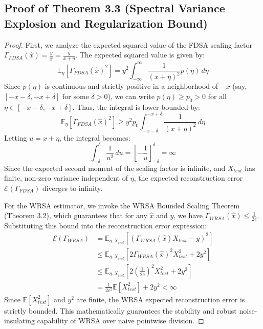 \documentclass{article}
\theoremstyle{plain}
\theoremstyle{definition}
\theoremstyle{remark}
\begin{document}
\subsection{Proof of Theorem 3.3 (Spectral Variance Explosion and Regularization Bound)}
\label{app:proof_variance_explosion}
\begin{proof}
  First, we analyze the expected squared value of the FDSA scaling factor $\Gamma_{FDSA}(\hat{x}) = \frac{y}{\hat{x}} = \frac{y}{x + \eta}$. The expected squared value is given by:
  \begin{equation}
    \mathbb{E}_{\eta} \left[ \Gamma_{FDSA}(\hat{x})^2 \right] = y^2 \int_{-\infty}^{\infty} \frac{1}{(x + \eta)^2} p(\eta) \, d\eta
  \end{equation}
  Since $p(\eta)$ is continuous and strictly positive in a neighborhood of $-x$ (say, $[ -x - \delta, -x + \delta ]$ for some $\delta > 0$), we can write $p(\eta) \ge p_0 > 0$ for all $\eta \in [ -x - \delta, -x + \delta ]$. Thus, the integral is lower-bounded by:
  \begin{equation}
    \mathbb{E}_{\eta} \left[ \Gamma_{FDSA}(\hat{x})^2 \right] \ge y^2 p_0 \int_{-x-\delta}^{-x+\delta} \frac{1}{(x + \eta)^2} \, d\eta
  \end{equation}
  Letting $u = x + \eta$, the integral becomes:
  \begin{equation}
    \int_{-\delta}^{\delta} \frac{1}{u^2} \, du = \left[ -\frac{1}{u} \right]_{-\delta}^{\delta} = \infty
  \end{equation}
  Since the expected second moment of the scaling factor is infinite, and $X_{test}$ has finite, non-zero variance independent of $\eta$, the expected reconstruction error $\mathcal{E}(\Gamma_{FDSA})$ diverges to infinity.

  For the WRSA estimator, we invoke the WRSA Bounded Scaling Theorem (Theorem 3.2), which guarantees that for any $\hat{x}$ and $y$, we have $\Gamma_{WRSA}(\hat{x}) \le \frac{1}{2c}$. Substituting this bound into the reconstruction error expression:
  \begin{align*}
    \mathcal{E}(\Gamma_{WRSA}) &= \mathbb{E}_{\eta, X_{test}} \left[ \left( \Gamma_{WRSA}(\hat{x}) X_{test} - y \right)^2 \right] \\
    &\le \mathbb{E}_{\eta, X_{test}} \left[ 2 \Gamma_{WRSA}(\hat{x})^2 X_{test}^2 + 2 y^2 \right] \\
    &\le \mathbb{E}_{\eta, X_{test}} \left[ 2 \left( \frac{1}{2c} \right)^2 X_{test}^2 + 2 y^2 \right] \\
    &= \frac{1}{2c^2} \mathbb{E}[X_{test}^2] + 2 y^2 < \infty
  \end{align*}
  Since $\mathbb{E}[X_{test}^2]$ and $y^2$ are finite, the WRSA expected reconstruction error is strictly bounded. This mathematically guarantees the stability and robust noise-insulating capability of WRSA over naive pointwise division.
\end{proof}
\end{document}
